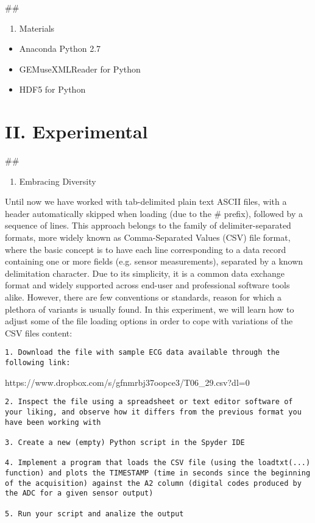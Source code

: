 \documentclass[11pt]{article}
\providecommand{\tightlist}{%
      \setlength{\itemsep}{0pt}\setlength{\parskip}{0pt}}
\begin{document}
    \#\#

\begin{enumerate}
\def\labelenumi{\arabic{enumi}.}
\setcounter{enumi}{2}
\tightlist
\item
  Materials
\end{enumerate}

\begin{itemize}
\tightlist
\item
  Anaconda Python 2.7
\item
  GEMuseXMLReader for Python
\item
  HDF5 for Python
\end{itemize}

    \section{II. Experimental}\label{ii.-experimental}

    \#\#

\begin{enumerate}
\def\labelenumi{\arabic{enumi}.}
\tightlist
\item
  Embracing Diversity
\end{enumerate}

Until now we have worked with tab-delimited plain text ASCII files, with
a header automatically skipped when loading (due to the \# prefix),
followed by a sequence of lines. This approach belongs to the family of
delimiter-separated formats, more widely known as Comma-Separated Values
(CSV) file format, where the basic concept is to have each line
corresponding to a data record containing one or more fields (e.g.
sensor measurements), separated by a known delimitation character. Due
to its simplicity, it is a common data exchange format and widely
supported across end-user and professional software tools alike.
However, there are few conventions or standards, reason for which a
plethora of variants is usually found. In this experiment, we will learn
how to adjust some of the file loading options in order to cope with
variations of the CSV files content:

\begin{verbatim}
1. Download the file with sample ECG data available through the following link:
\end{verbatim}

https://www.dropbox.com/s/gfnmrbj37oopce3/T06\_29.csv?dl=0

\begin{verbatim}
2. Inspect the file using a spreadsheet or text editor software of your liking, and observe how it differs from the previous format you have been working with

3. Create a new (empty) Python script in the Spyder IDE

4. Implement a program that loads the CSV file (using the loadtxt(...) function) and plots the TIMESTAMP (time in seconds since the beginning of the acquisition) against the A2 column (digital codes produced by the ADC for a given sensor output)

5. Run your script and analize the output
\end{verbatim}
\end{document}
